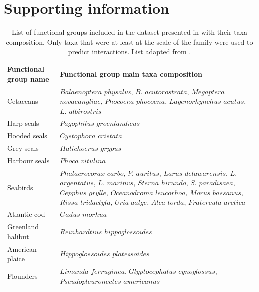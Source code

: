 \section{Supporting information}
\begin{singlespace}
\begin{table}[h!]
    \caption{List of functional groups included in the dataset presented in \citet{savenkoff2004} with their taxa composition. Only taxa that were at least at the scale of the family were used to predict interactions. List adapted from \citet{savenkoff2004}.}
    \centering
    \small
    \begin{tabularx}{1\textwidth}{|s|b|}
        \hline
        Functional group name   & Functional group main taxa composition    \\
        \hline \hline
        Cetaceans                          & $Balaenoptera$ $physalus$, $B.$ $acutorostrata$, $Megaptera$ $novaeangliae$, $Phocoena$ $phocoena$, $Lagenorhynchus$ $acutus$, $L.$ $albirostris$  \\
        \hline
        Harp seals                         & $Pagophilus$ $groenlandicus$   \\
        \hline
        Hooded seals                       & $Cystophora$ $cristata$    \\
        \hline
        Grey seals                         & $Halichoerus$ $grypus$ \\
        \hline
        Harbour seals                      & $Phoca$ $vitulina$ \\
        \hline
        Seabirds                           & $Phalacrocorax$ $carbo$, $P.$ $auritus$, $Larus$ $delawarensis$, $L.$ $argentatus$, $L.$ $marinus$, $Sterna$ $hirundo$, $S.$ $paradisaea$, $Cepphus$ $grylle$, $Oceanodroma$ $leucorhoa$, $Morus$ $bassanus$, $Rissa$ $tridactyla$, $Uria$ $aalge$, $Alca$ $torda$, $Fratercula$ $arctica$ \\
        \hline
        Atlantic cod                       & $Gadus$ $morhua$   \\
        \hline
        Greenland halibut                  & $Reinhardtius$ $hippoglossoides$   \\
        \hline
        American plaice                    & $Hippoglossoides$ $platessoides$   \\
        \hline
        Flounders                          & $Limanda$ $ferruginea$, $Glyptocephalus$ $cynoglossus$, $Pseudopleuronectes$ $americanus$  \\

\end{tabularx}
\end{table}
\end{singlespace}
